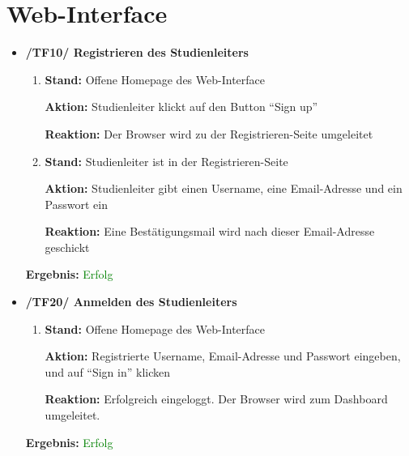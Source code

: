 \documentclass[a4paper]{scrreprt}
\begin{document}
	      \section{Web-Interface}
		      \begin{itemize}
		      		          \item \textbf{/TF10/ Registrieren des Studienleiters}
		      		          \begin{enumerate}
		      		               \item \par \textbf{Stand: }Offene Homepage des Web-Interface
		      		                \par \textbf{Aktion: }Studienleiter klickt auf den Button ``Sign up''
		      		                \par \textbf{Reaktion: }Der Browser wird zu der Registrieren-Seite umgeleitet
		      			            \item \par \textbf{Stand: }Studienleiter ist in der Registrieren-Seite
		      		                \par \textbf{Aktion: }Studienleiter gibt einen Username, eine Email-Adresse und ein Passwort ein
		      		                \par \textbf{Reaktion: }Eine Bestätigungsmail wird nach dieser Email-Adresse geschickt
		      		           \end{enumerate}
		      		           \vspace*{0.3cm}
		      		           \par \textbf{Ergebnis: }\textcolor{green}{Erfolg}
		      		           \vspace*{0.6cm}
		      		           
		                          \item \textbf{/TF20/ Anmelden des Studienleiters}
		                              \begin{enumerate}
		                                  \item \par \textbf{Stand: }Offene Homepage des Web-Interface
		                                      \par \textbf{Aktion: }Registrierte Username, Email-Adresse und Passwort eingeben, und auf “Sign in” klicken
		                                      \par \textbf{Reaktion: }Erfolgreich eingeloggt. Der Browser wird zum Dashboard umgeleitet.
		                              \end{enumerate}		         
		      		           \vspace*{0.3cm}
		      		           \par \textbf{Ergebnis: }\textcolor{green}{Erfolg}
		      		           \vspace*{0.6cm}  
		      		       

\end{itemize}
\end{document}
